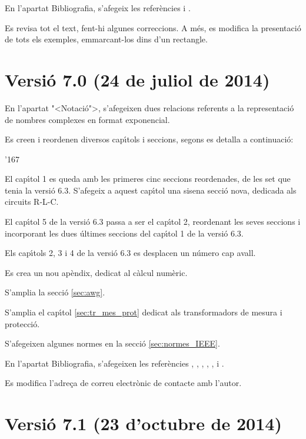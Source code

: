 En l'apartat Bibliografia, s'afegeix les refer\`{e}ncies \cite{KAS} i \cite{JCD}.

Es revisa tot el text, fent-hi algunes correccions. A m\'{e}s, es modifica la presentaci\'{o} de tots els exemples, emmarcant-los dins d'un rectangle.


\section*{Versi\'{o} 7.0 (24 de juliol de 2014)}

En l'apartat {"<}Notaci\'{o}{">}, s'afegeixen dues  relacions referents a la representaci\'{o} de nombres complexes en format exponencial.

Es creen i reordenen diversos cap\'{\i}tols i seccions, segons es detalla a continuaci\'{o}:
\begin{dinglist}{'167}
   \item El cap\'{\i}tol 1 es queda amb les primeres cinc seccions reordenades, de les set que tenia la versi\'{o} 6.3. S'afegeix a aquest cap\'{\i}tol una sisena secci\'{o} nova, dedicada als circuits R-L-C.
   \item El cap\'{\i}tol 5 de la versi\'{o} 6.3 passa a ser el cap\'{\i}tol 2, reordenant les seves seccions i incorporant les dues \'{u}ltimes seccions del cap\'{\i}tol 1 de la versi\'{o} 6.3.
   \item Els cap\'{\i}tols 2, 3 i 4  de la versi\'{o} 6.3 es desplacen un n\'{u}mero cap avall.
   \item Es crea un nou ap\`{e}ndix, dedicat al c\`{a}lcul num\`{e}ric.
\end{dinglist}

S'amplia la secci\'{o} \ref{sec:awg}.

S'amplia el cap\'{\i}tol \ref{sec:tr_mes_prot} dedicat als transformadors de mesura i protecci\'{o}.

S'afegeixen algunes normes en la secci\'{o} \ref{sec:normes_IEEE}.

En l'apartat Bibliografia, s'afegeixen les refer\`{e}ncies \cite{GOM}, \cite{SPK}, \cite{JDH}, \cite{EJB},  \cite{PMA}, \cite{MAI} i \cite{KNU}.

Es modifica l'adre\c{c}a de correu electr\`{o}nic de contacte amb l'autor.


\section*{Versi\'{o} 7.1 (23 d'octubre de 2014)}

